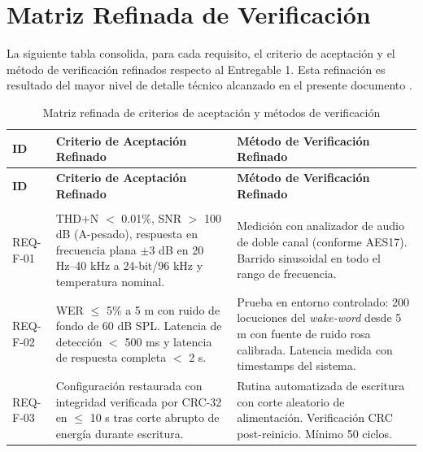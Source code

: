 \documentclass[%
	paper=a4,
	twoside=false,
	parskip=half,
	chapterprefix=false,
	10pt,
	headings=normal,
	bibliography=totoc,
	listof=totoc,
	titlepage=on,
	captions=tableabove,
	draft=false,
]{scrbook}%
\begin{document}
\chapter{Matriz Refinada de Verificación}
\label{chap:verificacion}

La siguiente tabla consolida, para cada requisito, el criterio de aceptación y el método de verificación refinados respecto al Entregable 1. Esta refinación es resultado del mayor nivel de detalle técnico alcanzado en el presente documento \cite{guia_entregable2}.

\begingroup
\small
\renewcommand{\arraystretch}{1.4}
\begin{longtable}{|>{\raggedright\arraybackslash}p{1.6cm}|
                   >{\raggedright\arraybackslash}p{6.2cm}|
                   >{\raggedright\arraybackslash}p{6.2cm}|}
\caption{Matriz refinada de criterios de aceptación y métodos de verificación} \label{tab:verificacion} \\

\hline
\rowcolor[HTML]{EFEFEF}
\textbf{ID} & \textbf{Criterio de Aceptación Refinado} & \textbf{Método de Verificación Refinado} \\ \hline
\endfirsthead

\hline
\rowcolor[HTML]{EFEFEF}
\textbf{ID} & \textbf{Criterio de Aceptación Refinado} & \textbf{Método de Verificación Refinado} \\ \hline
\endhead

\hline \multicolumn{3}{r}{\small Continúa en la siguiente página\ldots} \\
\endfoot

\hline
\endlastfoot

REQ-F-01 &
THD+N $<$ 0.01\%, SNR $>$ 100 dB (A-pesado), respuesta en frecuencia plana $\pm$3 dB en 20 Hz–40 kHz a 24-bit/96 kHz y temperatura nominal. &
Medición con analizador de audio de doble canal (conforme AES17). Barrido sinusoidal en todo el rango de frecuencia. \\ \hline

REQ-F-02 &
WER $\leq$ 5\% a 5 m con ruido de fondo de 60 dB SPL. Latencia de detección $<$ 500 ms y latencia de respuesta completa $<$ 2 s. &
Prueba en entorno controlado: 200 locuciones del \textit{wake-word} desde 5 m con fuente de ruido rosa calibrada. Latencia medida con timestamps del sistema. \\ \hline

REQ-F-03 &
Configuración restaurada con integridad verificada por CRC-32 en $\leq$ 10 s tras corte abrupto de energía durante escritura. &
Rutina automatizada de escritura con corte aleatorio de alimentación. Verificación CRC post-reinicio. Mínimo 50 ciclos. \\ \hline


\end{longtable}
\end{document}
